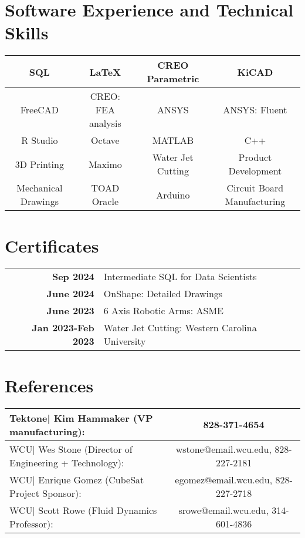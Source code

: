 \documentclass[allblack]{simplehipstercv}
\begin{document}
\begin{paracol}{2}
\section*{Software Experience and Technical Skills}
    \begin{tabular}{||c|c|c|c||}
        \hline
          SQL & LaTeX & CREO Parametric & KiCAD\\
         \hline
         FreeCAD & CREO: FEA analysis & ANSYS & ANSYS: Fluent\\
         \hline
         R Studio & Octave & MATLAB & C++\\
         \hline
         3D Printing & Maximo & Water Jet Cutting & Product Development\\
         \hline
         Mechanical Drawings & TOAD Oracle & Arduino & Circuit Board Manufacturing\\
        \hline
    \end{tabular}

\section*{Certificates}
\begin{tabular}{>{\footnotesize\bfseries}r p{}}
    Sep 2024 & Intermediate SQL for Data Scientists \\
    June 2024 & OnShape: Detailed Drawings \\
    June 2023 & 6 Axis Robotic Arms: ASME \\
    Jan 2023-Feb 2023 & Water Jet Cutting: Western Carolina University \\
\end{tabular}

\section*{References}
\begin{tabular}{l c}
    Tektone| Kim Hammaker (VP manufacturing): & 828-371-4654\\
    \hline
    WCU| Wes Stone (Director of Engineering + Technology): & wstone@email.wcu.edu, 828-227-2181\\
    \hline
    WCU| Enrique Gomez (CubeSat Project Sponsor): & egomez@email.wcu.edu, 828-227-2718\\
    \hline
    WCU| Scott Rowe (Fluid Dynamics Professor): & srowe@email.wcu.edu, 314-601-4836
\end{tabular}
\bigskip
\newpage

\end{paracol}
\end{document}
